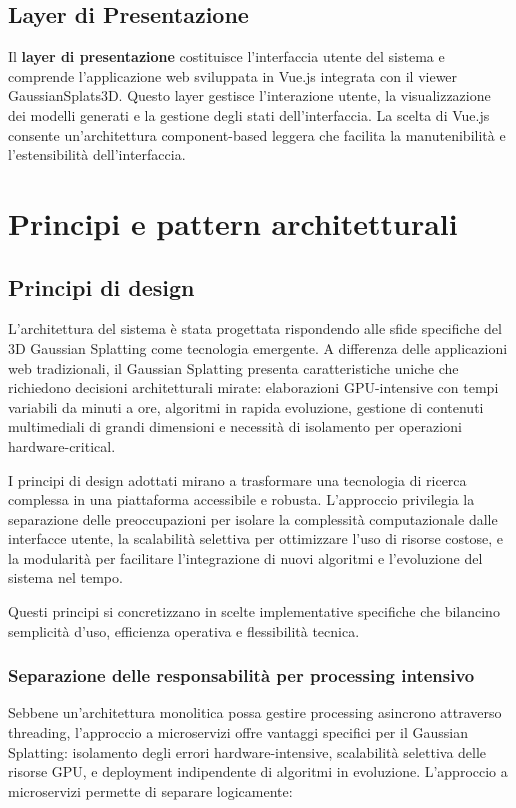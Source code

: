\subsection{Layer di Presentazione}
Il \textbf{layer di presentazione} costituisce l'interfaccia utente del sistema e comprende l'applicazione web sviluppata in Vue.js integrata con il viewer GaussianSplats3D. Questo layer gestisce l'interazione utente, la visualizzazione dei modelli generati e la gestione degli stati dell'interfaccia. La scelta di Vue.js consente un'architettura component-based leggera che facilita la manutenibilità e l'estensibilità dell'interfaccia.

\section{Principi e pattern architetturali}

\subsection{Principi di design}
L'architettura del sistema è stata progettata rispondendo alle sfide specifiche del 3D Gaussian Splatting come tecnologia emergente. A differenza delle applicazioni web tradizionali, il Gaussian Splatting presenta caratteristiche uniche che richiedono decisioni architetturali mirate: elaborazioni GPU-intensive con tempi variabili da minuti a ore, algoritmi in rapida evoluzione, gestione di contenuti multimediali di grandi dimensioni e necessità di isolamento per operazioni hardware-critical.

I principi di design adottati mirano a trasformare una tecnologia di ricerca complessa in una piattaforma accessibile e robusta. L'approccio privilegia la separazione delle preoccupazioni per isolare la complessità computazionale dalle interfacce utente, la scalabilità selettiva per ottimizzare l'uso di risorse costose, e la modularità per facilitare l'integrazione di nuovi algoritmi e l'evoluzione del sistema nel tempo.

Questi principi si concretizzano in scelte implementative specifiche che bilancino semplicità d'uso, efficienza operativa e flessibilità tecnica.

\subsubsection{Separazione delle responsabilità per processing intensivo}
Sebbene un'architettura monolitica possa gestire processing asincrono 
attraverso threading, l'approccio a microservizi offre vantaggi specifici 
per il Gaussian Splatting: isolamento degli errori hardware-intensive, 
scalabilità selettiva delle risorse GPU, e deployment indipendente di 
algoritmi in evoluzione.
L'approccio a microservizi permette di separare logicamente:

